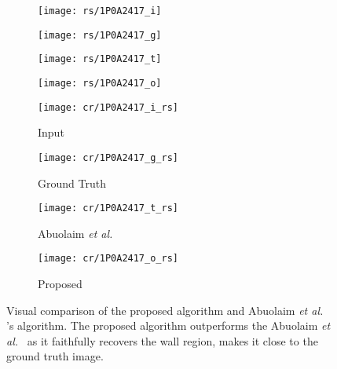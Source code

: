 \documentclass[final]{cvpr}
\begin{document}
\begin{figure*}
	\label{fig1}
        \begin{subfigure}[b]{0.245\textwidth}
                \texttt{[image: rs/1P0A2417\_i]}
        \end{subfigure}\hspace{\fill}
        \begin{subfigure}[b]{0.245\textwidth}
                \texttt{[image: rs/1P0A2417\_g]}
        \end{subfigure}\hspace{\fill}
        \begin{subfigure}[b]{0.245\textwidth}
                \texttt{[image: rs/1P0A2417\_t]}
        \end{subfigure}\hspace{\fill}
        \begin{subfigure}[b]{0.245\textwidth}
                \texttt{[image: rs/1P0A2417\_o]}
        \end{subfigure}
        
        
        
        \begin{subfigure}[b]{0.245\textwidth}
                \texttt{[image: cr/1P0A2417\_i\_rs]}
                \caption{Input}
                \label{fig:gull}
        \end{subfigure}\hspace{\fill}
        \begin{subfigure}[b]{0.245\textwidth}
                \texttt{[image: cr/1P0A2417\_g\_rs]}
                \caption{Ground Truth}
                \label{fig:gull2}
        \end{subfigure}\hspace{\fill}
        \begin{subfigure}[b]{0.245\textwidth}
                \texttt{[image: cr/1P0A2417\_t\_rs]}
                \caption{Abuolaim \textit{et al.}~\cite{abuolaim2020defocus} }
                \label{fig:tiger}
        \end{subfigure}\hspace{\fill}
        \begin{subfigure}[b]{0.245\textwidth}
                \texttt{[image: cr/1P0A2417\_o\_rs]}
                \caption{Proposed}
                \label{fig:mouse}
        \end{subfigure}
        \caption{Visual comparison of the proposed algorithm and Abuolaim \textit{et al.}~\cite{abuolaim2020defocus}  's algorithm. The proposed algorithm outperforms the Abuolaim \textit{et al.}~\cite{abuolaim2020defocus}  as it faithfully recovers the wall region, makes it close to the ground truth image.}\label{fig:one}
\end{figure*}
\end{document}
